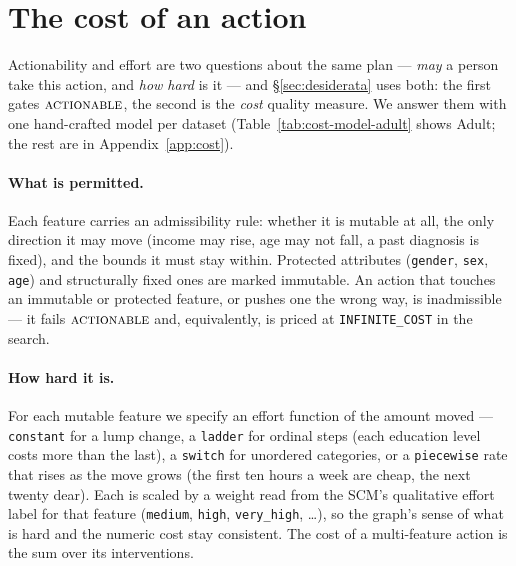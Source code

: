 \section{The cost of an action}
\label{sec:cost}

Actionability and effort are two questions about the same plan --- \emph{may} a
person take this action, and \emph{how hard} is it --- and \S\ref{sec:desiderata}
uses both: the first gates $\textsc{actionable}$, the second is the \emph{cost} quality
measure. We answer them with one hand-crafted model per dataset
(Table~\ref{tab:cost-model-adult} shows Adult; the rest are in
Appendix~\ref{app:cost}).

\paragraph{What is permitted.} Each feature carries an admissibility rule: whether
it is mutable at all, the only direction it may move (income may rise, age may not
fall, a past diagnosis is fixed), and the bounds it must stay within. Protected
attributes (\texttt{gender}, \texttt{sex}, \texttt{age}) and structurally fixed
ones are marked immutable. An action that touches an immutable or protected
feature, or pushes one the wrong way, is inadmissible --- it fails $\textsc{actionable}$ and,
equivalently, is priced at \texttt{INFINITE\_COST} in the search.

\paragraph{How hard it is.} For each mutable feature we specify an effort function
of the amount moved --- \texttt{constant} for a lump change, a \texttt{ladder} for
ordinal steps (each education level costs more than the last), a \texttt{switch}
for unordered categories, or a \texttt{piecewise} rate that rises as the move
grows (the first ten hours a week are cheap, the next twenty dear). Each is scaled
by a weight read from the SCM's qualitative effort label for that feature
(\texttt{medium}, \texttt{high}, \texttt{very\_high}, \dots), so the graph's sense
of what is hard and the numeric cost stay consistent. The cost of a multi-feature
action is the sum over its interventions.

